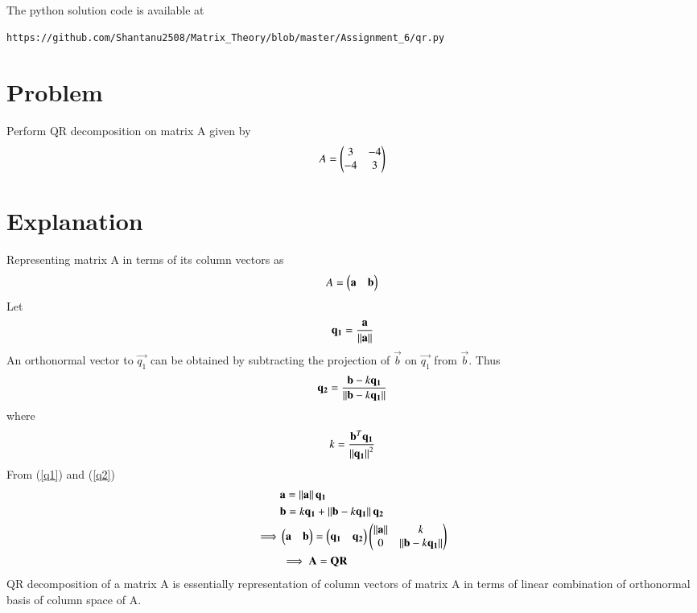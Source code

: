 \documentclass[journal,12pt,twocolumn]{IEEEtran}
\begin{document}
The python solution code is available at
\begin{lstlisting}
https://github.com/Shantanu2508/Matrix_Theory/blob/master/Assignment_6/qr.py
\end{lstlisting}

\section{Problem}
Perform QR decomposition on matrix A given by
\begin{align*}
	A = \begin{pmatrix}3 & -4 \\ -4 & 3\end{pmatrix} 
\end{align*}
\section{Explanation}
Representing matrix A in terms of its column vectors as
\begin{align}
	A=\begin{pmatrix}\mathbf{a} & \mathbf{b}\end{pmatrix}
\end{align}
Let
\begin{align}
	\vec{q_1}=\frac{\vec{a}}{\norm{\vec{a}}} \label{q1} 
\end{align}
An orthonormal vector to $\vec{q_1}$ can be obtained by subtracting the projection of $\vec{b}$ on $\vec{q_1}$ from $\vec{b}$. Thus
\begin{align}
	\vec{q_2}=\frac{\vec{b}-k\vec{q_1}}{\norm{\vec{b}-k\vec{q_1}}} \label{q2}
\end{align}
where
\begin{align}
	k=\frac{\vec{b}^T\vec{q_1}}{\norm{\vec{q_1}}^2} \label{k}
\end{align}
From (\ref{q1}) and (\ref{q2})
\begin{align}
	&\mathbf{a}=\left\lVert\mathbf{a}\right\rVert\mathbf{q_1} \\
	&\mathbf{b}=k\mathbf{q_1} + \left\lVert\mathbf{b}-k\mathbf{q_1}\right\rVert\mathbf{q_2} \\
	\implies 
	&\begin{pmatrix}\mathbf{a} & \mathbf{b}\end{pmatrix}=\begin{pmatrix}\mathbf{q_1} & \mathbf{q_2}\end{pmatrix}
        \begin{pmatrix}\left\lVert\mathbf{a}\right\rVert & k \\ 0 & \left\lVert\mathbf{b}-k\mathbf{q_1}\right\rVert\end{pmatrix} \\
	&\implies \mathbf{A}=\mathbf{Q}\mathbf{R}
\end{align}
QR decomposition of a matrix A is essentially representation of column vectors of matrix A in terms of linear combination of orthonormal basis of column space of A.
\end{document}
